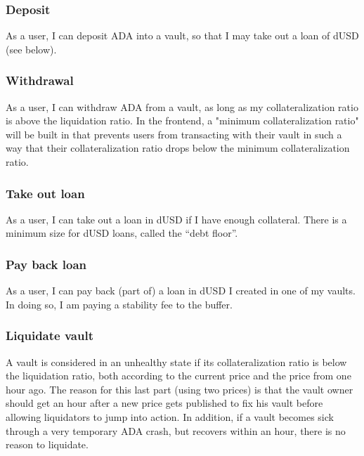 \documentclass{article} %
\begin{document}
\subsubsection{Deposit}

As a user, I can deposit ADA into a vault, so that I may take out a loan of dUSD
(see below).

\subsubsection{Withdrawal}

As a user, I can withdraw ADA from a vault, as long as my collateralization
ratio is above the liquidation ratio.
In the frontend, a "minimum collateralization ratio" will be built in that
prevents users from transacting with their vault in such a way that their
collateralization ratio drops below the minimum collateralization ratio.


\subsubsection{Take out loan}

As a user, I can take out a loan in dUSD if I have enough collateral.
There is a minimum size for dUSD loans, called the ``debt floor''.

\subsubsection{Pay back loan}

As a user, I can pay back (part of) a loan in dUSD I created in one of my
vaults.
In doing so, I am paying a stability fee to the buffer.

\subsubsection{Liquidate vault}

A vault is considered in an unhealthy state if its collateralization ratio is
below the liquidation ratio, both according to the current price and the price
from one hour ago.
The reason for this last part (using two prices) is that the vault owner should
get an hour after a new price gets published to fix his vault before allowing
liquidators to jump into action.
In addition, if a vault becomes sick through a very temporary ADA crash, but
recovers within an hour, there is no reason to liquidate. \\
\end{document}
